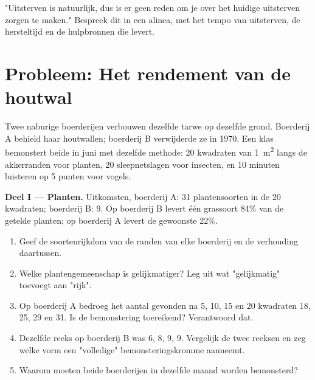 \begin{exercise}[$\star\star\star$]\label{exo:g10:biodiversity-scales:15}
"Uitsterven is natuurlijk, dus is er geen reden om je over het huidige
uitsterven zorgen te maken." Bespreek dit in een alinea, met het tempo
van uitsterven, de hersteltijd en de hulpbronnen die 
levert.
\end{exercise}

\section{Probleem: Het rendement van de houtwal}

\begin{problem}
\label{pb:g10:biodiversity-scales:1}
Twee naburige boerderijen verbouwen dezelfde tarwe op dezelfde grond.
Boerderij A behield haar houtwallen; boerderij B verwijderde ze in 1970.
Een klas bemonstert beide in juni met dezelfde methode: 20 kwadraten van
\qty{1}{m^2} langs de akkerranden voor planten, 20 sleepnetslagen voor
insecten, en 10 minuten luisteren op 5 punten voor vogels.

\medskip
\noindent\textbf{Deel I --- Planten.}
Uitkomsten, boerderij A: 31 plantensoorten in de 20 kwadraten;
boerderij B: 9. Op boerderij B levert één grassoort 84\% van de getelde
planten; op boerderij A levert de gewoonste  22\%.
\begin{enumerate}
  \item Geef de soortenrijkdom van de randen van elke boerderij en de
        verhouding daartussen.
  \item Welke plantengemeenschap is gelijkmatiger? Leg uit wat
        "gelijkmatig" toevoegt aan "rijk".
  \item Op boerderij A bedroeg het aantal gevonden  na 5, 10, 15
        en 20 kwadraten 18, 25, 29 en 31. Is de bemonstering toereikend?
        Verantwoord dat.
  \item Dezelfde reeks op boerderij B was 6, 8, 9, 9. Vergelijk de twee
        reeksen en zeg welke vorm een "volledige" bemonsteringskromme
        aanneemt.
  \item Waarom moeten beide boerderijen in dezelfde maand worden
        bemonsterd?
\end{enumerate}


\end{problem}
